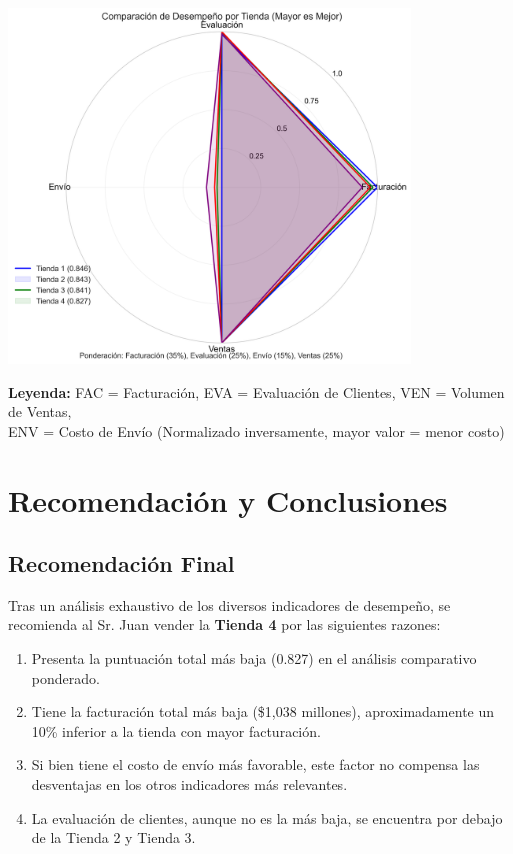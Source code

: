 \documentclass[12pt,a4paper]{report}\usepackage[spanish]{babel}\usepackage[utf8]{inputenc}\usepackage{graphicx}\usepackage{geometry}\usepackage{xcolor}\usepackage{tikz}\usepackage{pgfplots}\usepackage{booktabs}\usepackage{multicol}\usepackage{hyperref}\usepackage{pgf-pie}
\begin{document}
\begin{center}
\includegraphics[width=0.8\textwidth]{6_puntuacion_total.png}
\end{center}

\begin{center}
\textbf{Leyenda:} FAC = Facturación, EVA = Evaluación de Clientes, VEN = Volumen de Ventas,\\ 
ENV = Costo de Envío (Normalizado inversamente, mayor valor = menor costo)
\end{center}

\chapter{Recomendación y Conclusiones}

\section{Recomendación Final}

Tras un análisis exhaustivo de los diversos indicadores de desempeño, se recomienda al Sr. Juan vender la \textbf{Tienda 4} por las siguientes razones:

\begin{enumerate}
    \item Presenta la puntuación total más baja (0.827) en el análisis comparativo ponderado.
    \item Tiene la facturación total más baja (\$1,038 millones), aproximadamente un 10\% inferior a la tienda con mayor facturación.
    \item Si bien tiene el costo de envío más favorable, este factor no compensa las desventajas en los otros indicadores más relevantes.
    \item La evaluación de clientes, aunque no es la más baja, se encuentra por debajo de la Tienda 2 y Tienda 3.
\end{enumerate}
\end{document}

